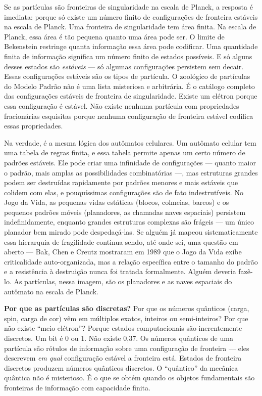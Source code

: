 \documentclass[11pt, twoside, openright]{book}
\begin{document}
Se as partículas são fronteiras de singularidade na escala de Planck, a resposta é imediata: porque só existe um número finito de configurações de fronteira estáveis na escala de Planck. Uma fronteira de singularidade tem área finita. Na escala de Planck, essa área é tão pequena quanto uma área pode ser. O limite de Bekenstein restringe quanta informação essa área pode codificar. Uma quantidade finita de informação significa um número finito de estados possíveis. E só alguns desses estados são \textit{estáveis} --- só algumas configurações persistem sem decair. Essas configurações estáveis são os tipos de partícula. O zoológico de partículas do Modelo Padrão não é uma lista misteriosa e arbitrária. É o catálogo completo das configurações estáveis de fronteira de singularidade. Existe um elétron porque essa configuração é estável. Não existe nenhuma partícula com propriedades fracionárias esquisitas porque nenhuma configuração de fronteira estável codifica essas propriedades.

Na verdade, é a mesma lógica dos autômatos celulares. Um autômato celular tem uma tabela de regras finita, e essa tabela permite apenas um certo número de padrões estáveis. Ele pode criar uma infinidade de configurações --- quanto maior o padrão, mais amplas as possibilidades combinatórias ---, mas estruturas grandes podem ser destruídas rapidamente por padrões menores e mais estáveis que colidem com elas, e pouquíssimas configurações são de fato indestrutíveis. No Jogo da Vida, as pequenas vidas estáticas (blocos, colmeias, barcos) e os pequenos padrões móveis (planadores, as chamadas naves espaciais) persistem indefinidamente, enquanto grandes estruturas complexas são frágeis --- um único planador bem mirado pode despedaçá-las. Se alguém já mapeou sistematicamente essa hierarquia de fragilidade continua sendo, até onde sei, uma questão em aberto --- Bak, Chen e Creutz mostraram em 1989 que o Jogo da Vida exibe criticalidade auto-organizada, mas a relação específica entre o tamanho do padrão e a resistência à destruição nunca foi tratada formalmente. Alguém deveria fazê-lo. As partículas, nessa imagem, são os planadores e as naves espaciais do autômato na escala de Planck.

\textbf{Por que as partículas são discretas?} Por que os números quânticos (carga, spin, carga de cor) vêm em múltiplos exatos, inteiros ou semi-inteiros? Por que não existe ``meio elétron''? Porque estados computacionais são inerentemente discretos. Um bit é 0 ou 1. Não existe 0,37. Os números quânticos de uma partícula são rótulos de informação sobre uma configuração de fronteira --- eles descrevem \textit{em qual} configuração estável a fronteira está. Estados de fronteira discretos produzem números quânticos discretos. O ``quântico'' da mecânica quântica não é misterioso. É o que se obtém quando os objetos fundamentais são fronteiras de informação com capacidade finita.
\end{document}
